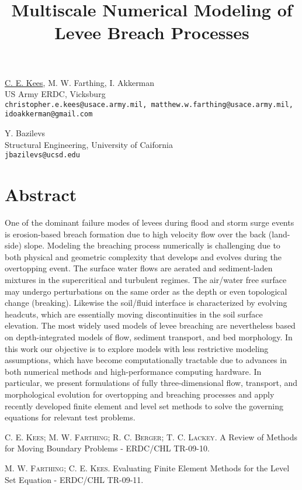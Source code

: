 \title{Multiscale Numerical Modeling of Levee Breach Processes}
\author{} \institute{}
\maketitle

\begin{center}
{\large \underline{C. E. Kees}, M. W. Farthing, I. Akkerman}\\
US Army ERDC, Vicksburg\\
{\tt christopher.e.kees@usace.army.mil, matthew.w.farthing@usace.army.mil, idoakkerman@gmail.com}\\
\vspace{4mm}

{\large Y. Bazilevs}\\
Structural Engineering, University of Caifornia\\
{\tt jbazilevs@ucsd.edu}
\end{center}

\section*{Abstract}
One of the dominant failure modes of levees during flood and storm surge events is erosion-based breach formation due to high velocity flow over the back (land-side) slope.  Modeling the breaching process numerically is challenging due to both physical and geometric complexity that develops and evolves during the overtopping event. The surface water flows are aerated and sediment-laden mixtures in the supercritical and turbulent regimes. The air/water free surface may undergo perturbations on the same order as the depth or even topological change (breaking). Likewise the soil/fluid interface is characterized by evolving headcuts, which are essentially moving discontinuities in the soil surface elevation. The most widely used models of levee breaching are nevertheless based on depth-integrated
models of flow, sediment transport, and bed morphology. In this work our objective is to explore models with less restrictive modeling assumptions, which have become computationally tractable due to advances in both numerical methods and high-performance computing hardware. In particular, we present formulations of fully three-dimensional flow, transport, and morphological evolution for overtopping and breaching processes and apply recently developed finite element and level set methods to solve the governing equations for relevant test problems.



\begin{thebibliography}{1}
\textsc{C. E. Kees; M. W. Farthing; R. C. Berger; T. C. Lackey}.
\newblock A Review of Methods for Moving Boundary Problems - ERDC/CHL TR-09-10.

\textsc{M. W. Farthing; C. E. Kees}.
\newblock Evaluating Finite Element Methods for the Level Set Equation - ERDC/CHL TR-09-11.
\end{thebibliography}
